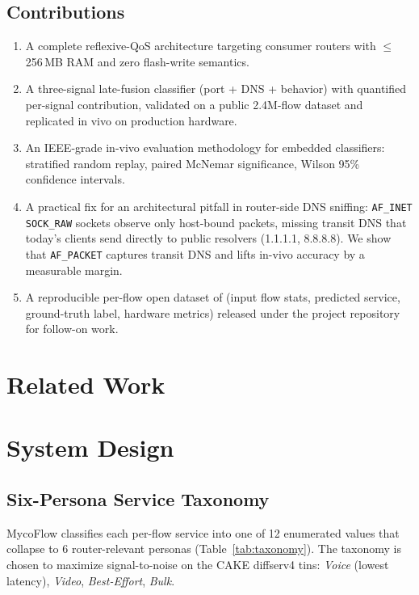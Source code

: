 \documentclass[journal,onecolumn]{IEEEtran}
\begin{document}
\subsection{Contributions}
\begin{enumerate}
\item A complete reflexive-QoS architecture targeting consumer routers
with $\leq$256\,MB RAM and zero flash-write semantics.
\item A three-signal late-fusion classifier (port + DNS + behavior) with
quantified per-signal contribution, validated on a public 2.4M-flow
dataset and replicated in vivo on production hardware.
\item An IEEE-grade in-vivo evaluation methodology for embedded
classifiers: stratified random replay, paired McNemar significance,
Wilson 95\% confidence intervals.
\item A practical fix for an architectural pitfall in router-side DNS
sniffing: \texttt{AF\_INET SOCK\_RAW} sockets observe only host-bound
packets, missing transit DNS that today's clients send directly to public
resolvers (1.1.1.1, 8.8.8.8). We show that \texttt{AF\_PACKET} captures
transit DNS and lifts in-vivo accuracy by a measurable margin.
\item A reproducible per-flow open dataset of (input flow stats, predicted
service, ground-truth label, hardware metrics) released under the project
repository for follow-on work.
\end{enumerate}

\section{Related Work}
\label{sec:related}


\section{System Design}
\label{sec:design}

\subsection{Six-Persona Service Taxonomy}

MycoFlow classifies each per-flow service into one of 12 enumerated values
that collapse to 6 router-relevant personas (Table~\ref{tab:taxonomy}).
The taxonomy is chosen to maximize signal-to-noise on the CAKE diffserv4
tins: \emph{Voice} (lowest latency), \emph{Video}, \emph{Best-Effort},
\emph{Bulk}.
\end{document}
